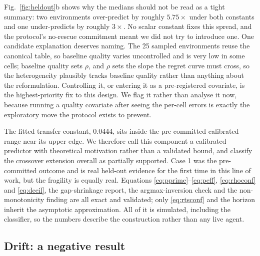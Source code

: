 \documentclass[conference]{IEEEtran}
\begin{document}
Fig.~\ref{fig:heldout}b shows why the medians should not be read as a tight
summary: two environments over-predict by roughly $5.75\times$ under both
constants and one under-predicts by roughly $3\times$. No scalar constant fixes
this spread, and the protocol's no-rescue commitment meant we did not try to
introduce one. One candidate explanation deserves naming. The 25 sampled
environments reuse the canonical table, so baseline quality varies uncontrolled
and is very low in some cells; baseline quality sets $\rho$, and $\rho$ sets
the slope the regret curve must cross, so the heterogeneity plausibly tracks
baseline quality rather than anything about the reformulation. Controlling it,
or entering it as a pre-registered covariate, is the highest-priority fix to
this design. We flag it rather than analyse it now, because running a quality
covariate after seeing the per-cell errors is exactly the exploratory move the
protocol exists to prevent.

The fitted transfer constant, 0.0444, sits inside the pre-committed calibrated
range near its upper edge. We therefore call this component a calibrated
predictor with theoretical motivation rather than a validated bound, and
classify the crossover extension overall as partially supported. Case 1 was the
pre-committed outcome and is real held-out evidence for the first time in this
line of work, but the fragility is equally real. Equations \eqref{eq:pprime}--\eqref{eq:peff}, \eqref{eq:rhoconf}
and \eqref{eq:dceil}, the gap-shrinkage report, the argmax-inversion check and
the non-monotonicity finding are all exact and validated; only
\eqref{eq:rtsconf} and the horizon inherit the asymptotic approximation. All of
it is simulated, including the classifier, so the numbers describe the
construction rather than any live agent.

\subsection{Drift: a negative result}
\end{document}
